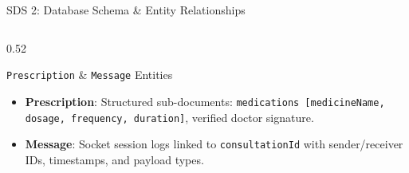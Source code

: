 \documentclass[aspectratio=169, 10pt]{beamer}
\begin{document}
\begin{frame}{SDS 2: Database Schema \& Entity Relationships}
\begin{columns}[T]
\begin{column}{0.52\textwidth}
        \begin{block}{\texttt{Prescription} \& \texttt{Message} Entities}
            \footnotesize
            \begin{itemize}
                \item \textbf{Prescription}: Structured sub-documents: \texttt{medications [medicineName, dosage, frequency, duration]}, verified doctor signature.
                \item \textbf{Message}: Socket session logs linked to \texttt{consultationId} with sender/receiver IDs, timestamps, and payload types.
            \end{itemize}
        \end{block}
    \end{column}
\end{columns}
\end{frame}
\end{document}
